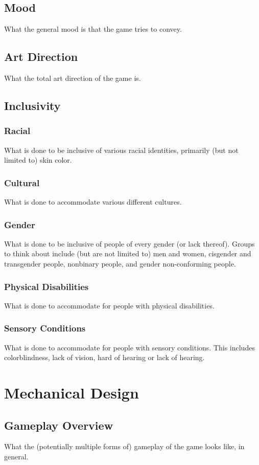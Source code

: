 \subsection{Mood}
What the general mood is that the game tries to convey.
\subsection{Art Direction}
What the total art direction of the game is.
\subsection{Inclusivity}
\subsubsection{Racial}
What is done to be inclusive of various racial identities, primarily (but not limited to) skin color.
\subsubsection{Cultural}
What is done to accommodate various different cultures.
\subsubsection{Gender}
What is done to be inclusive of people of every gender (or lack thereof). Groups to think about include (but are not limited to) men and women, cisgender and transgender people, nonbinary people, and gender non-conforming people.
\subsubsection{Physical Disabilities}
What is done to accommodate for people with physical disabilities.
\subsubsection{Sensory Conditions}
What is done to accommodate for people with sensory conditions. This includes colorblindness, lack of vision, hard of hearing or lack of hearing.

\section{Mechanical Design}
\subsection{Gameplay Overview}
What the (potentially multiple forms of) gameplay of the game looks like, in general.
